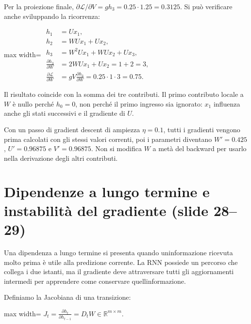 \documentclass[11pt,a4paper,oneside,openany]{book}
\begin{document}
Per la proiezione finale, \(\partial\mathcal L/\partial V=g h_3=0.25\cdot1.25=0.3125\). Si può verificare anche sviluppando la ricorrenza:

\begin{center}
\begin{adjustbox}{max width=\linewidth}
$\displaystyle 
\begin{aligned}
h_1&=Ux_1,\\
h_2&=WUx_1+Ux_2,\\
h_3&=W^2Ux_1+WUx_2+Ux_3,\\
\frac{\partial h_3}{\partial W}&=2WUx_1+Ux_2=1+2=3,\\
\frac{\partial\mathcal L}{\partial W}&=gV\frac{\partial h_3}{\partial W}=0.25\cdot1\cdot3=0.75.
\end{aligned}
$
\end{adjustbox}
\end{center}

Il risultato coincide con la somma dei tre contributi. Il primo contributo locale a \(W\) è nullo perché \(h_0=0\), non perché il primo ingresso sia ignorato: \(x_1\) influenza anche gli stati successivi e il gradiente di \(U\).

Con un passo di gradient descent di ampiezza \(\eta=0.1\), tutti i gradienti vengono prima calcolati con gli stessi valori correnti, poi i parametri diventano \(W'=0.425\), \(U'=0.96875\) e \(V'=0.96875\). Non si modifica \(W\) a metà del backward per usarlo nella derivazione degli altri contributi.

\section{Dipendenze a lungo termine e instabilità del gradiente (slide 28--29)}\label{f03-r547}

Una dipendenza a lungo termine si presenta quando un\textquotesingle informazione ricevuta molto prima è utile alla predizione corrente. La RNN possiede un percorso che collega i due istanti, ma il gradiente deve attraversare tutti gli aggiornamenti intermedi per apprendere come conservare quell\textquotesingle informazione.

Definiamo la Jacobiana di una transizione:

\begin{center}
\begin{adjustbox}{max width=\linewidth}
$\displaystyle \boxed{J_t=\frac{\partial h_t}{\partial h_{t-1}}=D_tW\in\mathbb R^{m\times m}.}$
\end{adjustbox}
\end{center}
\end{document}
